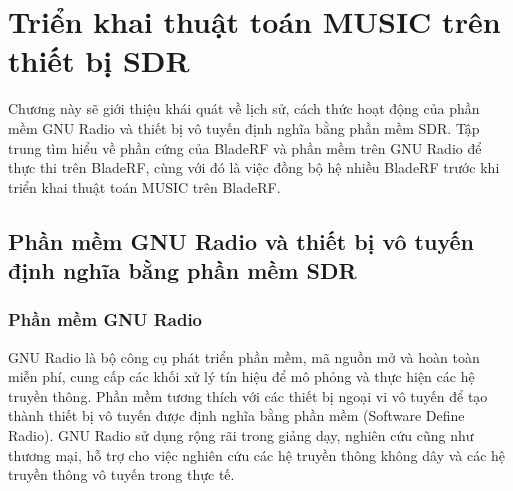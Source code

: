 \clearpage
{}

\setcounter{chapter}{1}
\chapter[{TRIỂN KHAI THUẬT TOÁN MUSIC TRÊN THIẾT BỊ SDR}]{Triển khai thuật toán MUSIC trên thiết bị SDR}


Chương này sẽ giới thiệu khái quát về lịch sử, cách thức hoạt động của phần mềm GNU Radio và thiết bị vô tuyến định nghĩa bằng phần mềm SDR. Tập trung tìm hiểu về phần cứng của BladeRF và phần mềm trên GNU Radio để thực thi trên BladeRF, cùng với đó là việc đồng bộ hệ nhiều BladeRF trước khi triển khai thuật toán MUSIC trên BladeRF.

\section{Phần mềm GNU Radio và thiết bị vô tuyến định nghĩa bằng phần mềm SDR}

\subsection{Phần mềm GNU Radio}

GNU Radio là bộ công cụ phát triển phần mềm, mã nguồn mở và hoàn toàn miễn phí, cung cấp các khối xử lý tín hiệu để mô phỏng và thực hiện các hệ truyền thông. Phần mềm tương thích với các thiết bị ngoại vi vô tuyến để tạo thành thiết bị vô tuyến được định nghĩa bằng phần mềm (Software Define Radio). GNU Radio sử dụng rộng rãi trong giảng dạy, nghiên cứu cũng như thương mại, hỗ trợ cho việc nghiên cứu các hệ truyền thông không dây và các hệ truyền thông vô tuyến trong thực tế.

